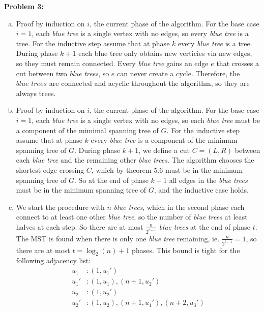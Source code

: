\documentclass{article}
\begin{document}
\textbf{Problem 3:}
\begin{enumerate}[a)]
    \item Proof by induction on $i$, the current phase of the algorithm. For the base case $i = 1$, each \textit{blue tree} is a single vertex with no edges, so every \textit{blue tree} is a tree. For the inductive step assume that at phase $k$ every \textit{blue tree} is a tree. During phase $k + 1$ each blue tree only obtains new verticies via new edges, so they must remain connected. Every \textit{blue tree} gains an edge $e$ that crosses a cut between two \textit{blue trees}, so $e$ can never create a cycle. Therefore, the $\textit{blue trees}$ are connected and acyclic throughout the algorithm, so they are always trees.
    \item Proof by induction on $i$, the current phase of the algorithm. For the base case $i = 1$, each \textit{blue tree} is a single vertex with no edges, so each \textit{blue tree} must be a component of the mimimal spanning tree of $G$. For the inductive step assume that at phase $k$ every \textit{blue tree} is a component of the minimum spanning tree of $G$. During phase $k + 1$, we define a cut $C = (L, R)$ between each \textit{blue tree} and the remaining other \textit{blue trees}. The algorithm chooses the shortest edge crossing $C$, which by theorem $5.6$ must be in the minimum spanning tree of $G$. So at the end of phase $k + 1$ all edges in the \textit{blue trees} must be in the minimum spanning tree of $G$, and the inductive case holds. 
    \item We start the procedure with $n$ \textit{blue trees}, which in the second phase each connect to at least one other \textit{blue tree}, so the number of \textit{blue trees} at least halves at each step. So there are at most $\frac{n}{2^{t - 1}}$ \textit{blue trees} at the end of phase $t$. The MST is found when there is only one \textit{blue tree} remaining, ie. $\frac{n}{2^{t - 1}} = 1$, so there are at most $t = \log_2(n) + 1$ phases. This bound is tight for the following adjacency list:
    \begin{align*}
        u_1 &: (1, u_1') \\
        u_1' &: (1, u_1), (n + 1, u_2') \\
        u_2 &: (1, u_2') \\
        u_2' &: (1, u_2), (n + 1, u_1'), (n + 2, u_3') \\

\end{align*}
\end{enumerate}
\end{document}
